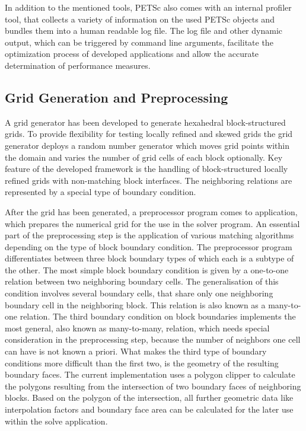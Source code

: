 In addition to the mentioned tools, PETSc also comes with an internal profiler tool, that collects a variety of information on the used PETSc objects and bundles them into a human readable log file. The log file and other dynamic output, which can be triggered by command line arguments, facilitate the optimization process of developed applications and allow the accurate determination of performance measures.

\subsection{Grid Generation and Preprocessing}
\label{sec:gridpreproc}

A grid generator has been developed to generate hexahedral block-structured grids. To provide flexibility for testing locally refined and skewed grids the grid generator deploys a random number generator which moves grid points within the domain and varies the number of grid cells of each block optionally. Key feature of the developed framework is the handling of block-structured locally refined grids with non-matching block interfaces. The neighboring relations are represented by a special type of boundary condition.

After the grid has been generated, a preprocessor program comes to application, which prepares the numerical grid for the use in the solver program. An essential part of the preprocessing step is the application of various matching algorithms depending on the type of block boundary condition. The preprocessor program differentiates between three block boundary types of which each is a subtype of the other. The most simple block boundary condition is given by a one-to-one relation between two neighboring boundary cells. The generalisation of this condition involves several boundary cells, that share only one neighboring boundary cell in the neighboring block. This relation is also known as a many-to-one relation. The third boundary condition on block boundaries implements the most general, also known as many-to-many, relation, which needs special consideration in the preprocessing step, because the number of neighbors one cell can have is not known a priori. What makes the third type of boundary conditions more difficult than the first two, is the geometry of the resulting boundary faces. The current implementation uses a polygon clipper to calculate the polygons resulting from the intersection of two boundary faces of neighboring blocks. Based on the polygon of the intersection, all further geometric data like interpolation factors and boundary face area can be  calculated for the later use within the solve application.

